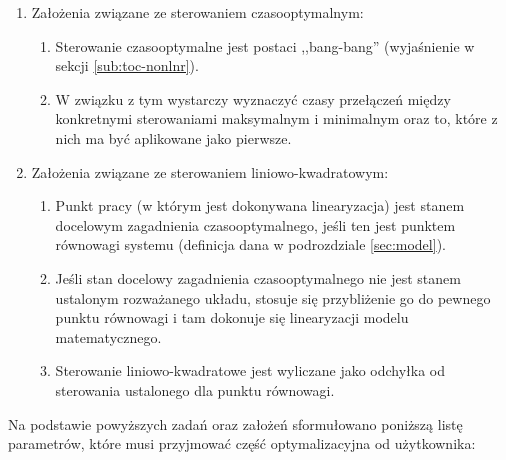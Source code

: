 \begin{enumerate}
    \item Założenia związane ze sterowaniem czasooptymalnym:
    \begin{enumerate}
        \item Sterowanie czasooptymalne jest postaci ,,bang-bang'' (wyjaśnienie w sekcji \ref{sub:toc-nonlnr}).
        \item W związku z tym wystarczy wyznaczyć czasy przełączeń między konkretnymi sterowaniami maksymalnym i minimalnym oraz to, które z nich ma być aplikowane jako pierwsze.
    \end{enumerate}
    \item Założenia związane ze sterowaniem liniowo-kwadratowym:
    \begin{enumerate}
        \item Punkt pracy (w którym jest dokonywana linearyzacja) jest stanem docelowym zagadnienia czasooptymalnego, jeśli ten jest punktem równowagi systemu (definicja dana w podrozdziale \ref{sec:model}).
        \item Jeśli stan docelowy zagadnienia czasooptymalnego nie jest stanem ustalonym rozważanego układu, stosuje się przybliżenie go do pewnego punktu równowagi i tam dokonuje się linearyzacji modelu matematycznego.
        \item Sterowanie liniowo-kwadratowe jest wyliczane jako odchyłka od sterowania ustalonego dla punktu równowagi.
    \end{enumerate}
\end{enumerate}

Na podstawie powyższych zadań oraz założeń sformułowano poniższą listę parametrów, które musi przyjmować część optymalizacyjna od użytkownika:

